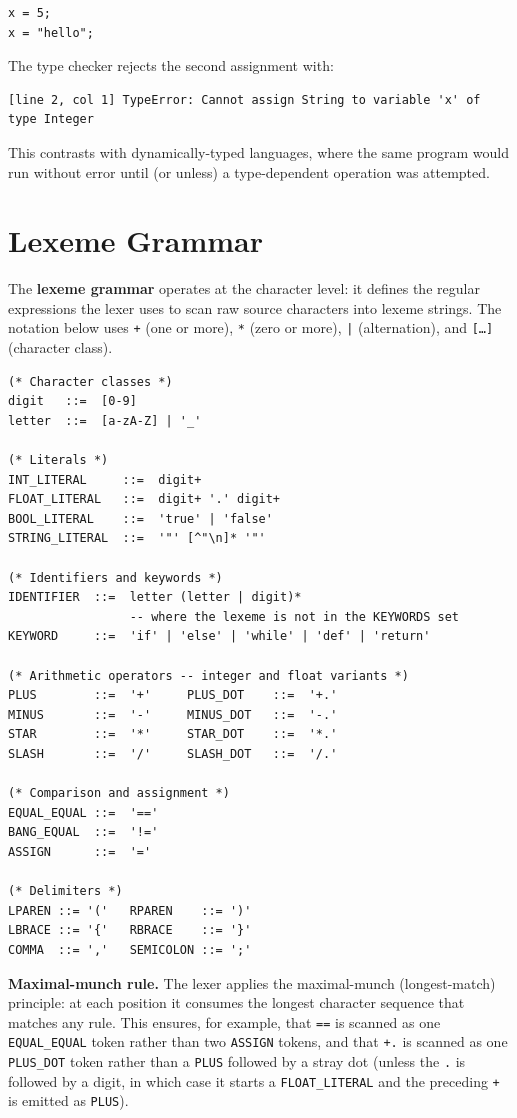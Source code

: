 \begin{lstlisting}
x = 5;
x = "hello";
\end{lstlisting}

\noindent The type checker rejects the second assignment with:
\begin{lstlisting}
[line 2, col 1] TypeError: Cannot assign String to variable 'x' of type Integer
\end{lstlisting}

\noindent This contrasts with dynamically-typed languages, where the same
program would run without error until (or unless) a type-dependent operation
was attempted.

\section{Lexeme Grammar}
\label{sec:lexeme-grammar}
The \textbf{lexeme grammar} operates at the character level: it defines the
regular expressions the lexer uses to scan raw source characters into lexeme
strings. The notation below uses \texttt{+} (one or more), \texttt{*} (zero or
more), \texttt{|} (alternation), and \texttt{[\ldots]} (character class).

\begin{lstlisting}
(* Character classes *)
digit   ::=  [0-9]
letter  ::=  [a-zA-Z] | '_'

(* Literals *)
INT_LITERAL     ::=  digit+
FLOAT_LITERAL   ::=  digit+ '.' digit+
BOOL_LITERAL    ::=  'true' | 'false'
STRING_LITERAL  ::=  '"' [^"\n]* '"'

(* Identifiers and keywords *)
IDENTIFIER  ::=  letter (letter | digit)*
                 -- where the lexeme is not in the KEYWORDS set
KEYWORD     ::=  'if' | 'else' | 'while' | 'def' | 'return'

(* Arithmetic operators -- integer and float variants *)
PLUS        ::=  '+'     PLUS_DOT    ::=  '+.'
MINUS       ::=  '-'     MINUS_DOT   ::=  '-.'
STAR        ::=  '*'     STAR_DOT    ::=  '*.'
SLASH       ::=  '/'     SLASH_DOT   ::=  '/.'

(* Comparison and assignment *)
EQUAL_EQUAL ::=  '=='
BANG_EQUAL  ::=  '!='
ASSIGN      ::=  '='

(* Delimiters *)
LPAREN ::= '('   RPAREN    ::= ')'
LBRACE ::= '{'   RBRACE    ::= '}'
COMMA  ::= ','   SEMICOLON ::= ';'
\end{lstlisting}

\noindent\textbf{Maximal-munch rule.}
The lexer applies the maximal-munch (longest-match) principle: at each
position it consumes the longest character sequence that matches any rule.
This ensures, for example, that \texttt{==} is scanned as one
\texttt{EQUAL\_EQUAL} token rather than two \texttt{ASSIGN} tokens, and that
\texttt{+.} is scanned as one \texttt{PLUS\_DOT} token rather than a
\texttt{PLUS} followed by a stray dot (unless the \texttt{.} is followed by a
digit, in which case it starts a \texttt{FLOAT\_LITERAL} and the preceding
\texttt{+} is emitted as \texttt{PLUS}).

